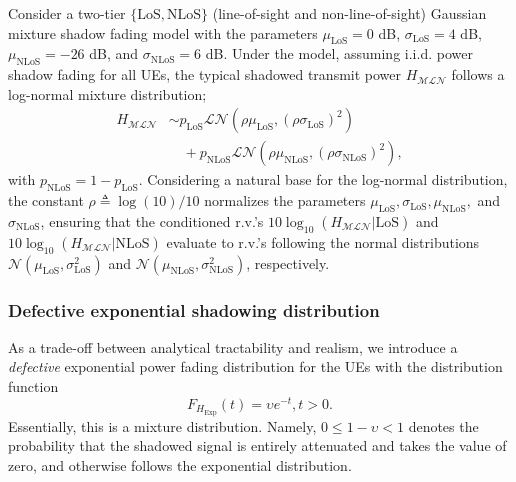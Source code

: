 \documentclass[lettersize,journal]{IEEEtran}
\begin{document}
Consider a two-tier $\{\text{LoS},\text{NLoS}\}$ (line-of-sight and non-line-of-sight) Gaussian mixture shadow fading model with the parameters $\mu_{\text{LoS}} = 0$ dB, $\sigma_{\text{LoS}} = 4$ dB, $\mu_{\text{NLoS}} = -26$ dB, and $\sigma_{\text{NLoS}} = 6$ dB. Under the model, assuming i.i.d. power shadow fading for all UEs, the typical shadowed transmit power $H_{\mathcal{M}\mathcal{L}\mathcal{N}}$ follows a log-normal mixture distribution;
\begin{align}
  \label{eq:tier2lognormal}
  H_{\mathcal{M}\mathcal{L}\mathcal{N}} &\sim p_{\text{LoS}} \mathcal{L}\mathcal{N}(\rho \mu_{\text{LoS}}, (\rho \sigma_{\text{LoS}})^2) \nonumber \\
  &\quad + p_{\text{NLoS}} \mathcal{L}\mathcal{N}(\rho \mu_{\text{NLoS}}, (\rho \sigma_{\text{NLoS}})^2),
\end{align}
with $p_{\text{NLoS}}= 1 - p_{\text{LoS}}$. Considering a natural base for the log-normal distribution, the constant $\rho \triangleq \log(10)/10$ normalizes the parameters $\mu_{\text{LoS}}, \sigma_{\text{LoS}}, \mu_{\text{NLoS}},$ and $\sigma_{\text{NLoS}}$, ensuring that the conditioned r.v.'s $10 \log_{10}(H_{\mathcal{MLN}}|\text{LoS})$ and $10 \log_{10}(H_{\mathcal{MLN}}|\text{NLoS})$ evaluate to r.v.'s following the normal distributions $\mathcal{N}(\mu_{\text{LoS}}, \sigma_{\text{LoS}}^2)$ and $\mathcal{N}(\mu_{\text{NLoS}}, \sigma_{\text{NLoS}}^2)$, respectively.



\subsubsection{Defective exponential shadowing distribution}
As a trade-off between analytical tractability and realism, we introduce a \textit{defective} exponential power fading distribution for the UEs with the distribution function
\begin{equation}
  \label{eq:defexp}
  F_{{H}_{\text{Exp}}}(t) = \upsilon e^{-t}, t>0.
\end{equation}
Essentially, this is a mixture distribution. Namely, $0 \leq 1-\upsilon < 1$ denotes the probability that the shadowed signal is entirely attenuated and takes the value of zero, and otherwise follows the exponential distribution. 
\end{document}
